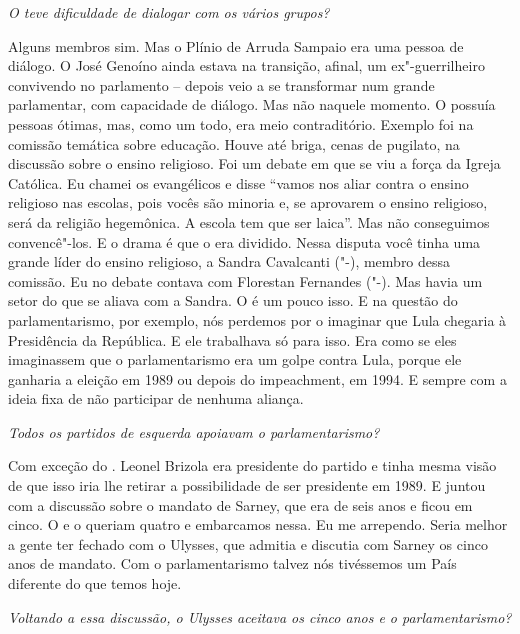 \medskip

\noindent\emph{O  teve dificuldade de dialogar com os vários grupos?}

Alguns membros sim. Mas o Plínio de Arruda Sampaio era
uma pessoa de diálogo. O José Genoíno ainda estava na transição, afinal,
um ex"-guerrilheiro convivendo no parlamento -- depois veio a se
transformar num grande parlamentar, com capacidade de diálogo. Mas não
naquele momento. O  possuía pessoas ótimas, mas, como um todo, era
meio contraditório. Exemplo foi na comissão temática sobre educação.
Houve até briga, cenas de pugilato, na discussão sobre o ensino
religioso. Foi um debate em que se viu a força da Igreja Católica. Eu
chamei os evangélicos e disse ``vamos nos aliar contra o ensino
religioso nas escolas, pois vocês são minoria e, se aprovarem o ensino
religioso, será da religião hegemônica. A escola tem que ser laica''.
Mas não conseguimos convencê"-los. E o drama é que o  era dividido.
Nessa disputa você tinha uma grande líder do ensino religioso, a Sandra
Cavalcanti ("-), membro dessa comissão. Eu no debate contava com
Florestan Fernandes ("-). Mas havia um setor do  que se aliava com
a Sandra. O  é um pouco isso. E na questão do parlamentarismo, por
exemplo, nós perdemos por o  imaginar que Lula chegaria à Presidência
da República. E ele trabalhava só para isso. Era como se eles
imaginassem que o parlamentarismo era um golpe contra Lula, porque ele
ganharia a eleição em 1989 ou depois do impeachment, em 1994. E sempre
com a ideia fixa de não participar de nenhuma aliança.

\medskip

\noindent\emph{Todos os partidos de esquerda apoiavam o parlamentarismo?}

Com exceção do . Leonel Brizola era presidente do
partido e tinha mesma visão de que isso iria lhe retirar a possibilidade
de ser presidente em 1989. E juntou com a discussão sobre o mandato de
Sarney, que era de seis anos e ficou em cinco. O  e o  queriam
quatro e embarcamos nessa. Eu me arrependo. Seria melhor a gente ter
fechado com o Ulysses, que admitia e discutia com Sarney os cinco anos
de mandato. Com o parlamentarismo talvez nós tivéssemos um País
diferente do que temos hoje.

\medskip

\noindent\emph{Voltando a essa discussão, o Ulysses aceitava os cinco anos e o
parlamentarismo?}

